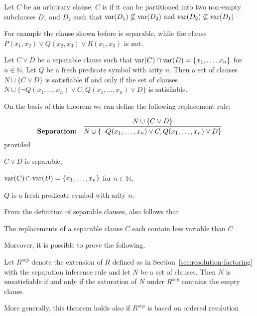 \begin{definition}
  Let \(C\) be an arbitrary clause. \(C\) is  if it can be partitioned into two non-empty subclauses \(D_1\) and \(D_2\) such that \(\text{var} (D_1) \not\subseteq \text{var} (D_2) \text{ and } \text{var} (D_2) \not\subseteq \text{var} (D_1)\)
\end{definition}
\noindent For example the clause shown before is separable, while the clause \(P(x_1,x_2) \lor Q(x_2,x_3) \lor R(x_1,x_3)\) is not.
\begin{theorem}\label{thm:separation}
  Let \(C \lor D\) be a separable clause such that \(\text{var} (C) \cap \text{var} (D) = \{x_1,\ldots,x_n\}\) for \(n \in \mathbb{N}\).
  Let \(Q\) be a fresh predicate symbol with arity \(n\).
  Then a set of clauses \(N \cup \{C\lor D\}\) is satisfiable if and only if the set of clauses \(N \cup \{\neg Q(x_1,\ldots, x_n) \lor C, Q(x_1,\ldots, x_n) \lor D\}\) is satisfiable.
\end{theorem}
On the basis of this theorem we can define the following replacement rule:

\begin{equation}\label{eq:separation-rule}
  \bold{Separation:} \quad \infer{N \cup \{\neg Q(x_1,\ldots, x_n) \lor C, Q(x_1,\ldots, x_n) \lor D\}}{N \cup \{C \lor D\}}
\end{equation}
\indent provided 
\begin{enumerate*}[label = (\roman*)]
  \item \(C \lor D\) is separable,
  \item \(\text{var} (C) \cap \text{var} (D) = \{x_1,\ldots,x_n\}\) for \(n \in \mathbb{N}\),
  \item \(Q\) is \indent a fresh predicate symbol with arity \(n\).
\end{enumerate*}

\noindent From the definition of separable clauses, also follows that
\begin{lemma}\label{lem:separation-replacement}
  The replacements of a separable clause \(C\) each contain less variable than \(C\)
\end{lemma}
Moreover, it is possible to prove the following.

\begin{theorem}
  Let \(R^{sep}\) denote the extension of \(R\) defined as in Section~\ref{sec:resolution-factoring} with the separation inference rule and let \(N\) be a set of clauses.
  Then \(N\) is unsatisfiable if and only if the saturation of \(N\) under \(R^{sep}\) contains the empty clause.
\end{theorem}
More generally, this theorem holds also if \(R^{sep}\) is based on ordered resolution

